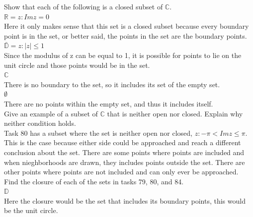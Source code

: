 \documentclass[12pt]{article}
\begin{document}
 Show that each of the following is a closed subset of $\mathbb{C}$.\\

 $\mathbb{R} = {z: Im z = 0}$ \\

Here it only makes sense that this set is a closed subset because every boundary point is in the set, or better said, the points in the set are the boundary points.\\

 $\bar{\mathbb{D}} = {z: |z| \leq 1}$\\

Since the modulus of z can be equal to 1, it is possible for points to lie on the unit circle and those points would be in the set.\\

 $\mathbb{C}$\\

There is no boundary to the set, so it includes its set of the empty set.\\

 $\emptyset$\\

There are no points within the empty set, and thus it includes itself.\\


 Give an example of a subset of $\mathbb{C}$ that is neither open nor closed.
Explain why neither condition holds.\\

Task 80 has a subset where the set is neither open nor closed, ${z: -\pi < Im z \leq \pi}$. 
This is the case because either side could be approached and reach a different conclusion about the set.
There are some points where points are included and when nieghborhoods are drawn, they includes points outside the set.
There are other points where points are not included and can only ever be approached.\\


 Find the closure of each of the sets in tasks 79, 80, and 84.\\

 $\mathbb{D}$\\

Here the closure would be the set that includes its boundary points, 
this would be the unit circle.\\
\end{document}
